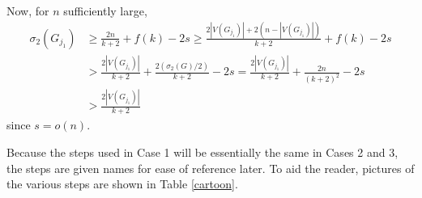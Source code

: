 \documentclass[12pt]{amsart}
\begin{document}
Now, for $n$ sufficiently large, 
\begin{equation}\label{Gj_sig2} \begin{split}
\sigma_2(G_{j_1})&\geq \frac{2n}{k+2}+f(k)-2s \geq \frac{2|V(G_{j_1})| +2(n-|V(G_{j_1})|)}{k+2}+f(k)-2s\\
&> \frac{2|V(G_{j_1})|}{k+2} + \frac{2(\sigma_2(G)/2)}{k+2}-2s=\frac{2|V(G_{j_1})|}{k+2} + \frac{2n}{(k+2)^2}-2s\\
&>\frac{2|V(G_{j_1})|}{k+2}
\end{split}\end{equation} 
since $s=o(n).$

Because the steps used in Case 1 will be essentially the same in Cases 2 and 3, the steps are given names for ease of reference later. To aid the reader, pictures of the various steps are shown in Table \ref{cartoon}.
\end{document}
